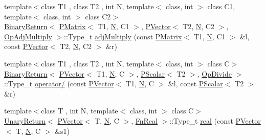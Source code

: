 \begin{DoxyCompactItemize}
\item 
{\footnotesize template$<$class T1 , class T2 , int N, template$<$ class, int $>$ class C1, template$<$ class, int $>$ class C2$>$ }\\\mbox{\hyperlink{structENSEM_1_1BinaryReturn}{Binary\+Return}}$<$ \mbox{\hyperlink{classENSEM_1_1PMatrix}{P\+Matrix}}$<$ T1, \mbox{\hyperlink{operator__name__util_8cc_a7722c8ecbb62d99aee7ce68b1752f337}{N}}, C1 $>$, \mbox{\hyperlink{classENSEM_1_1PVector}{P\+Vector}}$<$ T2, \mbox{\hyperlink{operator__name__util_8cc_a7722c8ecbb62d99aee7ce68b1752f337}{N}}, C2 $>$, \mbox{\hyperlink{structENSEM_1_1OpAdjMultiply}{Op\+Adj\+Multiply}} $>$\+::Type\+\_\+t \mbox{\hyperlink{group__primvector_ga1728ca784073c199bee500323e8ae96e}{adj\+Multiply}} (const \mbox{\hyperlink{classENSEM_1_1PMatrix}{P\+Matrix}}$<$ T1, \mbox{\hyperlink{operator__name__util_8cc_a7722c8ecbb62d99aee7ce68b1752f337}{N}}, C1 $>$ \&l, const \mbox{\hyperlink{classENSEM_1_1PVector}{P\+Vector}}$<$ T2, \mbox{\hyperlink{operator__name__util_8cc_a7722c8ecbb62d99aee7ce68b1752f337}{N}}, C2 $>$ \&r)
\item 
{\footnotesize template$<$class T1 , class T2 , int N, template$<$ class, int $>$ class C$>$ }\\\mbox{\hyperlink{structENSEM_1_1BinaryReturn}{Binary\+Return}}$<$ \mbox{\hyperlink{classENSEM_1_1PVector}{P\+Vector}}$<$ T1, \mbox{\hyperlink{operator__name__util_8cc_a7722c8ecbb62d99aee7ce68b1752f337}{N}}, C $>$, \mbox{\hyperlink{classENSEM_1_1PScalar}{P\+Scalar}}$<$ T2 $>$, \mbox{\hyperlink{structENSEM_1_1OpDivide}{Op\+Divide}} $>$\+::Type\+\_\+t \mbox{\hyperlink{group__primvector_gac0d72c4d06047ab6be5503cc1b557a16}{operator/}} (const \mbox{\hyperlink{classENSEM_1_1PVector}{P\+Vector}}$<$ T1, \mbox{\hyperlink{operator__name__util_8cc_a7722c8ecbb62d99aee7ce68b1752f337}{N}}, C $>$ \&l, const \mbox{\hyperlink{classENSEM_1_1PScalar}{P\+Scalar}}$<$ T2 $>$ \&r)
\item 
{\footnotesize template$<$class T , int N, template$<$ class, int $>$ class C$>$ }\\\mbox{\hyperlink{structENSEM_1_1UnaryReturn}{Unary\+Return}}$<$ \mbox{\hyperlink{classENSEM_1_1PVector}{P\+Vector}}$<$ T, \mbox{\hyperlink{operator__name__util_8cc_a7722c8ecbb62d99aee7ce68b1752f337}{N}}, C $>$, \mbox{\hyperlink{structENSEM_1_1FnReal}{Fn\+Real}} $>$\+::Type\+\_\+t \mbox{\hyperlink{group__primvector_ga9198795b4cc43e6d68f0273dd10b3aa1}{real}} (const \mbox{\hyperlink{classENSEM_1_1PVector}{P\+Vector}}$<$ T, \mbox{\hyperlink{operator__name__util_8cc_a7722c8ecbb62d99aee7ce68b1752f337}{N}}, C $>$ \&s1)

\end{DoxyCompactItemize}
